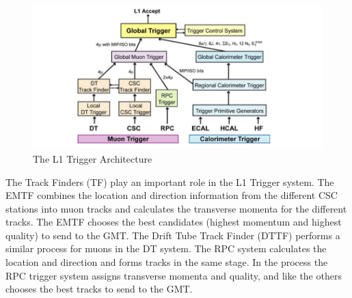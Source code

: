 \begin{figure}[h!]
  \centering
  \includegraphics[width=5in]{images/L1_Trigger.png}
  \caption
   {The L1 Trigger Architecture \cite{cmsexp}}
  \label{fig:l1trigarch}
\end{figure}

The Track Finders (TF) play an important role in the L1 Trigger system. The EMTF combines the location and direction information from the different CSC stations into muon tracks and calculates the transverse momenta for the different tracks. The EMTF chooses the best candidates (highest momentum and highest quality) to send to the GMT. The Drift Tube Track Finder (DTTF) performs a similar process for muons in the DT system. The RPC system calculates the location and direction and forms tracks in the same stage. In the process the RPC trigger system assigns transverse momenta and quality, and like the others chooses the best tracks to send to the GMT.
